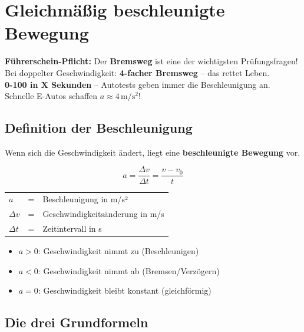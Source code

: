 \documentclass[11pt,a4paper]{article}
\begin{document}
\newpage
\section{Gleichmäßig beschleunigte Bewegung}

\begin{alltag}
\textbf{Führerschein-Pflicht:} Der \textbf{Bremsweg} ist eine der wichtigsten Prüfungsfragen! \\[0.3em]
Bei doppelter Geschwindigkeit: \textbf{4-facher Bremsweg} -- das rettet Leben.\\[0.3em]
\textbf{0-100 in X Sekunden} -- Autotests geben immer die Beschleunigung an. Schnelle E-Autos schaffen $a \approx 4\,\mathrm{m/s^2}$!
\end{alltag}

\subsection{Definition der Beschleunigung}

Wenn sich die Geschwindigkeit ändert, liegt eine \textbf{beschleunigte Bewegung} vor.

\begin{formelbox}[Beschleunigung]
\[
\boxed{a = \frac{\Delta v}{\Delta t} = \frac{v - v_0}{t}}
\]
\begin{center}
\begin{tabular}{lcl}
$a$ & = & Beschleunigung in m/s² \\
$\Delta v$ & = & Geschwindigkeitsänderung in m/s \\
$\Delta t$ & = & Zeitintervall in s
\end{tabular}
\end{center}
\end{formelbox}

\begin{merksatz}
\begin{itemize}
\item $a > 0$: Geschwindigkeit nimmt zu (Beschleunigen)
\item $a < 0$: Geschwindigkeit nimmt ab (Bremsen/Verzögern)
\item $a = 0$: Geschwindigkeit bleibt konstant (gleichförmig)
\end{itemize}
\end{merksatz}

\subsection{Die drei Grundformeln}
\end{document}
